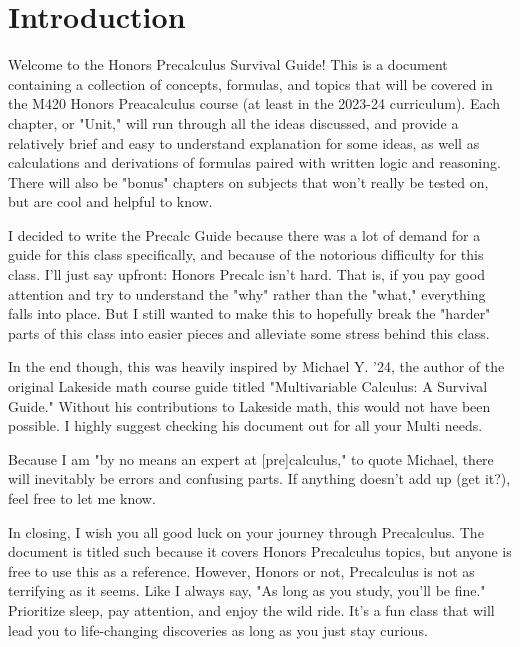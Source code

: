 \chapter{Introduction}

Welcome to the Honors Precalculus Survival Guide! This is a document containing a collection of concepts, formulas, and topics that will be covered in the M420 Honors Preacalculus course (at least in the 2023-24 curriculum). Each chapter, or "Unit," will run through all the ideas discussed, and provide a relatively brief and easy to understand explanation for some ideas, as well as calculations and derivations of formulas paired with written logic and reasoning. There will also be "bonus" chapters on subjects that won't really be tested on, but are cool and helpful to know.

I decided to write the Precalc Guide because there was a lot of demand for a guide for this class specifically, and because of the notorious difficulty for this class. I'll just say upfront: Honors Precalc isn't hard. That is, if you pay good attention and try to understand the "why" rather than the "what," everything falls into place. But I still wanted to make this to hopefully break the "harder" parts of this class into easier pieces and alleviate some stress behind this class.

In the end though, this was heavily inspired by Michael Y. '24, the author of the original Lakeside math course guide titled "Multivariable Calculus: A Survival Guide." Without his contributions to Lakeside math, this would not have been possible. I highly suggest checking his document out for all your Multi needs.

Because I am "by no means an expert at [pre]calculus," to quote Michael, there will inevitably be errors and confusing parts. If anything doesn't add up (get it?), feel free to let me know. 

In closing, I wish you all good luck on your journey through Precalculus. The document is titled such because it covers Honors Precalculus topics, but anyone is free to use this as a reference. However, Honors or not, Precalculus is not as terrifying as it seems. Like I always say, "As long as you study, you'll be fine." Prioritize sleep, pay attention, and enjoy the wild ride. It's a fun class that will lead you to life-changing discoveries as long as you just stay curious. 